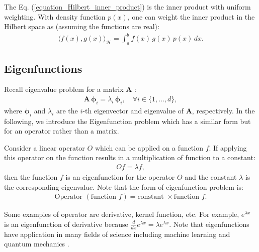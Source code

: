 \documentclass[lang=cn,10pt]{gorgeousnbook}
\numberwithin{equation}{section}%
\numberwithin{figure}{section}%
\begin{document}
\begin{corollary}
The Eq. (\ref{equation_Hilbert_inner_product}) is the inner product with uniform weighting. With density function $p(x)$, one can weight the inner product in the Hilbert space as (assuming the functions are real):
\begin{align}\label{equation_Hilbert_inner_product_weighted}
\langle f(x), g(x)  \rangle_\mathcal{H} = \int_a^b f(x)\, g(x)\, p(x)\, dx.
\end{align}
\end{corollary}

\subsection{Eigenfunctions}

Recall eigenvalue problem for a matrix $\boldsymbol{A}$ \cite{ghojogh2019eigenvalue}:
\begin{align}
\boldsymbol{A}\, \boldsymbol{\phi}_i = \lambda_i\, \boldsymbol{\phi}_i, \quad \forall i \in \{1, \dots, d\},
\end{align}
where $\boldsymbol{\phi}_i$ and $\lambda_i$ are the $i$-th eigenvector and eigenvalue of $\boldsymbol{A}$, respectively. 
In the following, we introduce the Eigenfunction problem which has a similar form but for an operator rather than a matrix. 

\begin{definition}[Eigenfunction]\label{definition_eigenfunction}
Consider a linear operator $O$ which can be applied on a function $f$. If applying this operator on the function results in a multiplication of function to a constant:
\begin{align}\label{equation_eigenfunction}
O f = \lambda f,
\end{align}
then the function $f$ is an eigenfunction for the operator $O$ and the constant $\lambda$ is the corresponding eigenvalue.
Note that the form of eigenfunction problem is:
\begin{align}
\text{Operator }( \text{function }f ) = \text{constant } \times \text{function }f.
\end{align}
\end{definition}
Some examples of operator are derivative, kernel function, etc. For example, $e^{\lambda x}$ is an eigenfunction of derivative because $\frac{d}{dx} e^{\lambda x} = \lambda e^{\lambda x}$.
Note that eigenfunctions have application in many fields of science including machine learning \cite{bengio2003spectral} and quantum mechanics \cite{reed1972methods}.
\end{document}
